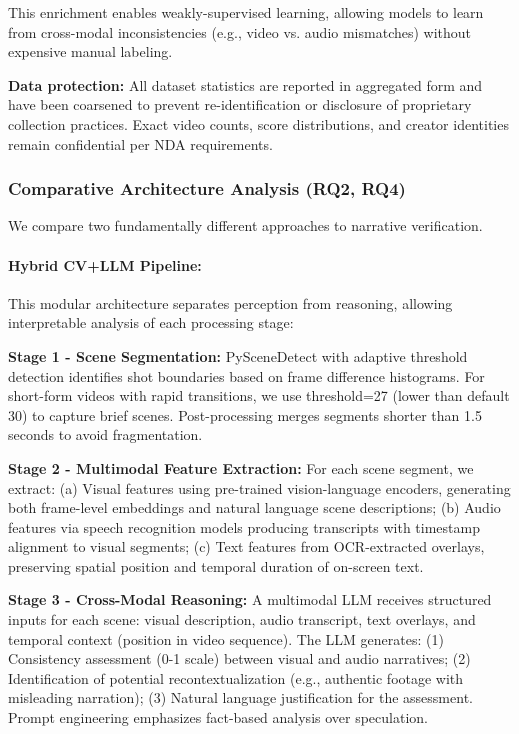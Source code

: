 \documentclass[runningheads]{llncs}
\begin{document}
This enrichment enables weakly-supervised learning, allowing models to learn from cross-modal inconsistencies (e.g., video vs. audio mismatches) without expensive manual labeling.

\textbf{Data protection:} All dataset statistics are reported in aggregated form and have been coarsened to prevent re-identification or disclosure of proprietary collection practices. Exact video counts, score distributions, and creator identities remain confidential per NDA requirements.

\subsubsection{Comparative Architecture Analysis (RQ2, RQ4)}

We compare two fundamentally different approaches to narrative verification.

\paragraph{Hybrid CV+LLM Pipeline:}

This modular architecture separates perception from reasoning, allowing interpretable analysis of each processing stage:

\textbf{Stage 1 - Scene Segmentation:} PySceneDetect with adaptive threshold detection identifies shot boundaries based on frame difference histograms. For short-form videos with rapid transitions, we use threshold=27 (lower than default 30) to capture brief scenes. Post-processing merges segments shorter than 1.5 seconds to avoid fragmentation.

\textbf{Stage 2 - Multimodal Feature Extraction:} For each scene segment, we extract: (a) Visual features using pre-trained vision-language encoders, generating both frame-level embeddings and natural language scene descriptions; (b) Audio features via speech recognition models producing transcripts with timestamp alignment to visual segments; (c) Text features from OCR-extracted overlays, preserving spatial position and temporal duration of on-screen text.

\textbf{Stage 3 - Cross-Modal Reasoning:} A multimodal LLM receives structured inputs for each scene: visual description, audio transcript, text overlays, and temporal context (position in video sequence). The LLM generates: (1) Consistency assessment (0-1 scale) between visual and audio narratives; (2) Identification of potential recontextualization (e.g., authentic footage with misleading narration); (3) Natural language justification for the assessment. Prompt engineering emphasizes fact-based analysis over speculation.
\end{document}
